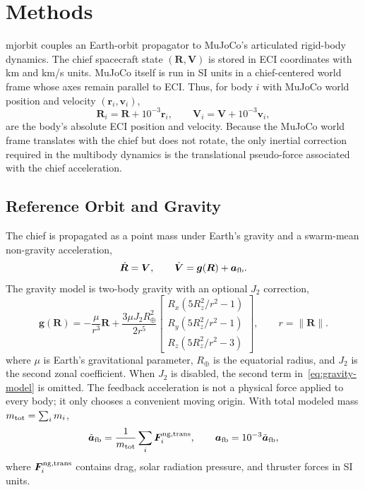 \documentclass[11pt]{article}
\newcommand{\mjorbit}{mjorbit}
\newcommand{\mj}{MuJoCo}
\begin{document}
\section{Methods}
\label{sec:methods}

\mjorbit{} couples an Earth-orbit propagator to \mj{}'s articulated rigid-body
dynamics. The chief spacecraft state $(\bm R,\bm V)$ is stored in ECI
coordinates with km and \si{km/s} units. \mj{} itself is run in SI units in a
chief-centered world frame whose axes remain parallel to ECI. Thus, for body
$i$ with \mj{} world position and velocity $(\bm r_i,\bm v_i)$,
\begin{equation}
  \bm R_i = \bm R + 10^{-3}\bm r_i,\qquad
  \bm V_i = \bm V + 10^{-3}\bm v_i,
  \label{eq:absolute-state}
\end{equation}
are the body's absolute ECI position and velocity. Because the \mj{} world
frame translates with the chief but does not rotate, the only inertial
correction required in the multibody dynamics is the translational
pseudo-force associated with the chief acceleration.

\subsection{Reference Orbit and Gravity}
\label{subsec:reference-orbit}

The chief is propagated as a point mass under Earth's gravity and a
swarm-mean non-gravity acceleration,
\begin{equation}
  \dot{\bm R}=\bm V,\qquad
  \dot{\bm V}=\bm g(\bm R)+\bm a_{\rm fb}.
  \label{eq:chief-dynamics}
\end{equation}
The gravity model is two-body gravity with an optional $J_2$ correction,
\begin{equation}
  \bm g(\bm R)=
  -\frac{\mu}{r^3}\bm R
  +\frac{3\mu J_2R_\oplus^2}{2r^5}
  \begin{bmatrix}
    R_x(5R_z^2/r^2-1)\\
    R_y(5R_z^2/r^2-1)\\
    R_z(5R_z^2/r^2-3)
  \end{bmatrix},
  \qquad r=\|\bm R\|.
  \label{eq:gravity-model}
\end{equation}
where $\mu$ is Earth's gravitational parameter, $R_\oplus$ is the equatorial
radius, and $J_2$ is the second zonal coefficient. When $J_2$ is disabled,
the second term in~\eqref{eq:gravity-model} is omitted. The feedback
acceleration is not a physical force applied to every body; it only chooses a
convenient moving origin. With total modeled mass $m_{\rm tot}=\sum_i m_i$,
\begin{equation}
  \tilde{\bm a}_{\rm fb} =
  \frac{1}{m_{\rm tot}}\sum_i \bm F_i^{\rm ng,trans},\qquad
  \bm a_{\rm fb}=10^{-3}\tilde{\bm a}_{\rm fb},
  \label{eq:feedback}
\end{equation}
where $\bm F_i^{\rm ng,trans}$ contains drag, solar radiation pressure, and
thruster forces in SI units.
\end{document}
